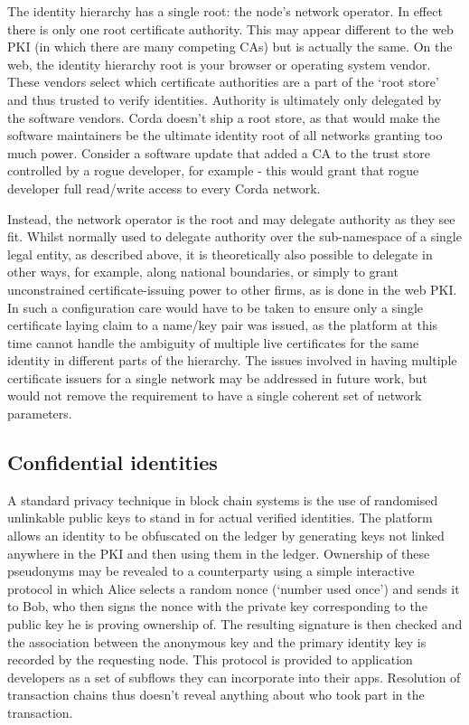\documentclass{article}
\begin{document}
The identity hierarchy has a single root: the node's network operator. In effect there is only one root certificate
authority. This may appear different to the web PKI (in which there are many competing CAs) but is actually the
same. On the web, the identity hierarchy root is your browser or operating system vendor. These vendors select which
certificate authorities are a part of the `root store' and thus trusted to verify identities. Authority is ultimately
only delegated by the software vendors. Corda doesn't ship a root store, as that would make the software maintainers
be the ultimate identity root of all networks granting too much power. Consider a software update that added a CA
to the trust store controlled by a rogue developer, for example - this would grant that rogue developer full read/write
access to every Corda network.

Instead, the network operator is the root and may delegate authority as they see fit. Whilst normally used to
delegate authority over the sub-namespace of a single legal entity, as described above, it is theoretically also
possible to delegate in other ways, for example, along national boundaries, or simply to grant unconstrained
certificate-issuing power to other firms, as is done in the web PKI. In such a configuration care would have to be
taken to ensure only a single certificate laying claim to a name/key pair was issued, as the platform at this time
cannot handle the ambiguity of multiple live certificates for the same identity in different parts of the
hierarchy. The issues involved in having multiple certificate issuers for a single network may be addressed in
future work, but would not remove the requirement to have a single coherent set of network parameters.

\subsection{Confidential identities}\label{subsec:confidential-identities}

A standard privacy technique in block chain systems is the use of randomised unlinkable public keys to stand in for
actual verified identities. The platform allows an identity to be obfuscated on the ledger by generating keys not
linked anywhere in the PKI and then using them in the ledger. Ownership of these pseudonyms may be revealed to a
counterparty using a simple interactive protocol in which Alice selects a random nonce (`number used once') and
sends it to Bob, who then signs the nonce with the private key corresponding to the public key he is proving
ownership of. The resulting signature is then checked and the association between the anonymous key and the primary
identity key is recorded by the requesting node. This protocol is provided to application developers as a set of
subflows they can incorporate into their apps. Resolution of transaction chains thus doesn't reveal anything about
who took part in the transaction.
\end{document}
